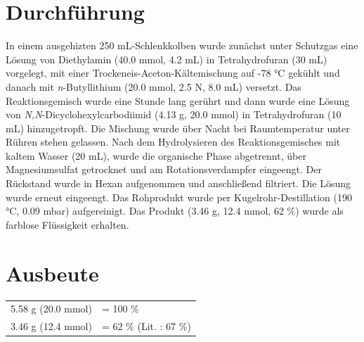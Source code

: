 \documentclass[12pt]{article}
\begin{document}
\begin{onehalfspace}
\section{Durchführung \cite{vor}}
In einem ausgehizten 250 mL-Schlenkkolben wurde zunächst unter Schutzgas eine Lösung von Diethylamin (40.0 \si{\milli\mol}, 4.2 \si{\milli\liter}) in Tetrahydrofuran (30 \si{\milli\liter}) vorgelegt, mit einer Trockeneis-Aceton-Kältemischung auf -78 \si{\celsius} gekühlt und danach mit \textit{n}-Butyllithium (20.0 \si{\milli\mol}, 2.5 N, 8.0 \si{\milli\liter}) versetzt. Das Reaktionsgemisch wurde eine Stunde lang gerührt und dann wurde eine Lösung von \textit{N,N}-Dicyclohexylcarbodiimid (4.13 \si{\gram}, 20.0 \si{\milli\mol}) in Tetrahydrofuran (10 \si{\milli\liter}) hinzugetropft. Die Mischung wurde über Nacht bei Raumtemperatur unter Rühren stehen gelassen. Nach dem Hydrolysieren des Reaktionsgemisches mit kaltem Wasser (20 \si{\milli\liter}), wurde die organische Phase abgetrennt, über Magnesiumsulfat getrocknet und am Rotationsverdampfer eingeengt. Der Rückstand wurde in Hexan aufgenommen und anschließend filtriert. Die Lösung wurde erneut eingeengt. Das Rohprodukt wurde per Kugelrohr-Destillation (190 \si{\celsius}, 0.09 \si{\milli\bar}) aufgereinigt. Das Produkt (3.46 g, 12.4 mmol, 62 \%) wurde als farblose Flüssigkeit erhalten.
\section{Ausbeute}
\begin{tabular}{ ll}
  5.58 \si{\gram} (20.0 \si{\milli\mol})   & = 100 \%\\
  3.46 \si{\gram} (12.4 \si{\milli\mol})   & = 62 \% (Lit.\cite{vor} : 67 \%) \\
 \end{tabular}
\newpage


\end{onehalfspace}
\end{document}

